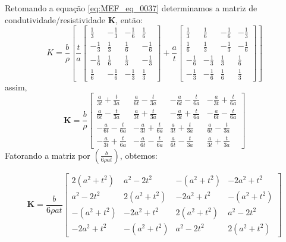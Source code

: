 \documentclass[
12pt,
a4paper,
oneside,
chapter=TITLE,
sumario=tradicional
]{abntex2}
\begin{document}
Retomando a equação \ref{eq:MEF_eq_0037} determinamos a matriz de condutividade/resistividade $\mathbf{K}$, então:
$$  
K = \frac{b}{\rho}  
\left[  
\frac{t}{a}  
\begin{bmatrix}  
	\frac{1}{3} & -\frac{1}{3} & -\frac{1}{6} & \frac{1}{6} \\  
	-\frac{1}{3} & \frac{1}{3} & \frac{1}{6} & -\frac{1}{6} \\  
	-\frac{1}{6} & \frac{1}{6} & \frac{1}{3} & -\frac{1}{3} \\  
	\frac{1}{6} & -\frac{1}{6} & -\frac{1}{3} & \frac{1}{3}  
\end{bmatrix}  
+  
\frac{a}{t}  
\begin{bmatrix}  
	\frac{1}{3} & \frac{1}{6} & -\frac{1}{6} & -\frac{1}{3} \\  
	\frac{1}{6} & \frac{1}{3} & -\frac{1}{3} & -\frac{1}{6} \\  
	-\frac{1}{6} & -\frac{1}{3} & \frac{1}{3} & \frac{1}{6} \\  
	-\frac{1}{3} & -\frac{1}{6} & \frac{1}{6} & \frac{1}{3}  
\end{bmatrix}  
\right]  
$$
assim,
$$  
\mathbf{K} =  
\frac{b}{\rho}  
\begin{bmatrix}  
	\frac{a}{3t}+\frac{t}{3a} &  
	\frac{a}{6t}-\frac{t}{3a} &  
	-\frac{a}{6t}-\frac{t}{6a} &  
	-\frac{a}{3t}+\frac{t}{6a} \\
	\frac{a}{6t}-\frac{t}{3a} &  
	\frac{a}{3t}+\frac{t}{3a} &  
	-\frac{a}{3t}+\frac{t}{6a} &  
	-\frac{a}{6t}-\frac{t}{6a} \\
	-\frac{a}{6t}-\frac{t}{6a} &  
	-\frac{a}{3t}+\frac{t}{6a} &  
	\frac{a}{3t}+\frac{t}{3a} &  
	\frac{a}{6t}-\frac{t}{3a} \\ 
	-\frac{a}{3t}+\frac{t}{6a} &  
	-\frac{a}{6t}-\frac{t}{6a} &  
	\frac{a}{6t}-\frac{t}{3a} &  
	\frac{a}{3t}+\frac{t}{3a}  
\end{bmatrix}  
$$
Fatorando a matriz por $(\frac{b}{6\rho at})$, obtemos:


\begin{equation}
    \mathbf{K} =  
	\frac{b}{6\rho at}  
	\begin{bmatrix}  
		2(a^2+t^2) & a^2-2t^2 & -(a^2+t^2) & -2a^2+t^2 \\  
		a^2-2t^2 & 2(a^2+t^2) & -2a^2+t^2 & -(a^2+t^2) \\  
		-(a^2+t^2) & -2a^2+t^2 & 2(a^2+t^2) & a^2-2t^2 \\  
		-2a^2+t^2 & -(a^2+t^2) & a^2-2t^2 & 2(a^2+t^2)  
	\end{bmatrix}  
	\label{eq:MEF_eq_0043}
\end{equation}
\end{document}
